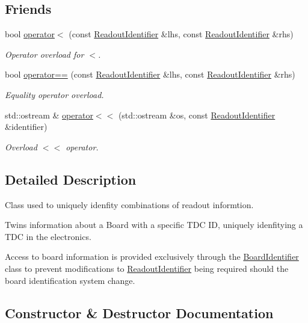 \subsection*{Friends}
\begin{DoxyCompactItemize}
\item 
bool \hyperlink{class_readout_identifier_aa0d096b09bfc6a21f2c29ec777e101f8}{operator$<$} (const \hyperlink{class_readout_identifier}{Readout\+Identifier} \&lhs, const \hyperlink{class_readout_identifier}{Readout\+Identifier} \&rhs)
\begin{DoxyCompactList}\small\item\em Operator overload for $<$. \end{DoxyCompactList}\item 
bool \hyperlink{class_readout_identifier_a91bb6963f51c84fd2d8bcf104fc0b226}{operator==} (const \hyperlink{class_readout_identifier}{Readout\+Identifier} \&lhs, const \hyperlink{class_readout_identifier}{Readout\+Identifier} \&rhs)
\begin{DoxyCompactList}\small\item\em Equality operator overload. \end{DoxyCompactList}\item 
std\+::ostream \& \hyperlink{class_readout_identifier_a62474a342fbe3d79da5b8a869d95e72e}{operator$<$$<$} (std\+::ostream \&os, const \hyperlink{class_readout_identifier}{Readout\+Identifier} \&identifier)
\begin{DoxyCompactList}\small\item\em Overload $<$$<$ operator. \end{DoxyCompactList}\end{DoxyCompactItemize}


\subsection{Detailed Description}
Class used to uniquely idenfity combinations of readout informtion. 

Twins information about a Board with a specific T\+DC ID, uniquely idenfitying a T\+DC in the electronics.

Access to board information is provided exclusively through the \hyperlink{class_board_identifier}{Board\+Identifier} class to prevent modifications to \hyperlink{class_readout_identifier}{Readout\+Identifier} being required should the board identification system change. 

\subsection{Constructor \& Destructor Documentation}
\mbox{\label{class_readout_identifier_a6dbfa3a186abade180d962aa22c81e71}} 

